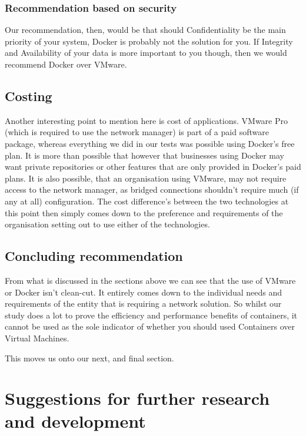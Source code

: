\subsubsection{Recommendation based on security}
Our recommendation, then, would be that should Confidentiality be the main priority of your system, Docker is probably not the solution for you. If Integrity and Availability of your data is more important to you though, then we would recommend Docker over VMware.

\subsection{Costing}
Another interesting point to mention here is cost of applications. VMware Pro (which is required to use the network manager) is part of a paid software package, whereas everything we did in our tests was possible using Docker's free plan. It is more than possible that however that businesses using Docker may want private repositories or other features that are only provided in Docker's paid plans. It is also possible, that an organisation using VMware, may not require access to the network manager, as bridged connections shouldn't require much (if any at all) configuration. The cost difference's between the two technologies at this point then simply comes down to the preference and requirements of the organisation setting out to use either of the technologies.

\subsection{Concluding recommendation}
From what is discussed in the sections above we can see that the use of VMware or Docker isn't clean-cut. It entirely comes down to the individual needs and requirements of the entity that is requiring a network solution. So whilst our study does a lot to prove the efficiency and performance benefits of containers, it cannot be used as the sole indicator of whether you should used Containers over Virtual Machines.

This moves us onto our next, and final section.

\section{Suggestions for further research and development}


